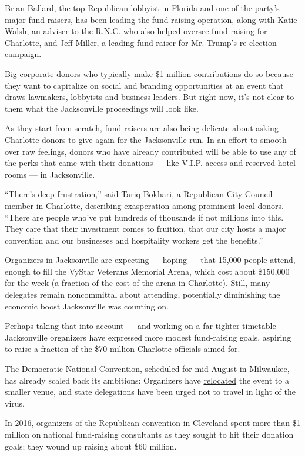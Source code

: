 Brian Ballard, the top Republican lobbyist in Florida and one of the
party's major fund-raisers, has been leading the fund-raising operation,
along with Katie Walsh, an adviser to the R.N.C. who also helped oversee
fund-raising for Charlotte, and Jeff Miller, a leading fund-raiser for
Mr. Trump's re-election campaign.

Big corporate donors who typically make \$1 million contributions do so
because they want to capitalize on social and branding opportunities at
an event that draws lawmakers, lobbyists and business leaders. But right
now, it's not clear to them what the Jacksonville proceedings will look
like.

As they start from scratch, fund-raisers are also being delicate about
asking Charlotte donors to give again for the Jacksonville run. In an
effort to smooth over raw feelings, donors who have already contributed
will be able to use any of the perks that came with their donations ---
like V.I.P. access and reserved hotel rooms --- in Jacksonville.

``There's deep frustration,'' said Tariq Bokhari, a Republican City
Council member in Charlotte, describing exasperation among prominent
local donors. ``There are people who've put hundreds of thousands if not
millions into this. They care that their investment comes to fruition,
that our city hosts a major convention and our businesses and
hospitality workers get the benefits.''

Organizers in Jacksonville are expecting --- hoping --- that 15,000
people attend, enough to fill the VyStar Veterans Memorial Arena, which
cost about \$150,000 for the week (a fraction of the cost of the arena
in Charlotte). Still, many delegates remain noncommittal about
attending, potentially diminishing the economic boost Jacksonville was
counting on.

Perhaps taking that into account --- and working on a far tighter
timetable --- Jacksonville organizers have expressed more modest
fund-raising goals, aspiring to raise a fraction of the \$70 million
Charlotte officials aimed for.

The Democratic National Convention, scheduled for mid-August in
Milwaukee, has already scaled back its ambitions: Organizers have
\href{https://www.nytimes.com/2020/06/24/us/politics/democratic-convention-milwaukee-coronavirus.html}{relocated}
the event to a smaller venue, and state delegations have been urged not
to travel in light of the virus.

In 2016, organizers of the Republican convention in Cleveland spent more
than \$1 million on national fund-raising consultants as they sought to
hit their donation goals; they wound up raising about \$60 million.

